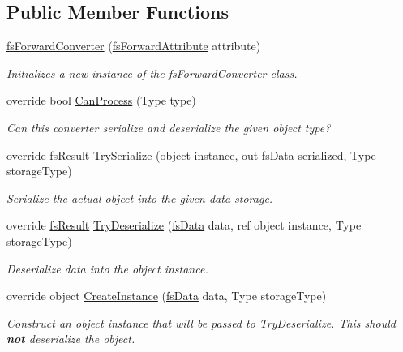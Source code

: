 \subsection*{Public Member Functions}
\begin{DoxyCompactItemize}
\item 
\hyperlink{class_full_serializer_1_1_internal_1_1fs_forward_converter_a485561a31edc65a3f1c6972af8b677e3}{fs\+Forward\+Converter} (\hyperlink{class_full_serializer_1_1fs_forward_attribute}{fs\+Forward\+Attribute} attribute)
\begin{DoxyCompactList}\small\item\em Initializes a new instance of the \hyperlink{class_full_serializer_1_1_internal_1_1fs_forward_converter}{fs\+Forward\+Converter} class. \end{DoxyCompactList}\item 
override bool \hyperlink{class_full_serializer_1_1_internal_1_1fs_forward_converter_a252f2f0a0391e2099be798b1749a2582}{Can\+Process} (Type type)
\begin{DoxyCompactList}\small\item\em Can this converter serialize and deserialize the given object type? \end{DoxyCompactList}\item 
override \hyperlink{struct_full_serializer_1_1fs_result}{fs\+Result} \hyperlink{class_full_serializer_1_1_internal_1_1fs_forward_converter_a71b51a115cf749f1a3232fb1498f2d6f}{Try\+Serialize} (object instance, out \hyperlink{class_full_serializer_1_1fs_data}{fs\+Data} serialized, Type storage\+Type)
\begin{DoxyCompactList}\small\item\em Serialize the actual object into the given data storage. \end{DoxyCompactList}\item 
override \hyperlink{struct_full_serializer_1_1fs_result}{fs\+Result} \hyperlink{class_full_serializer_1_1_internal_1_1fs_forward_converter_a81d2d460112d57d67e8156cd5a52e1e1}{Try\+Deserialize} (\hyperlink{class_full_serializer_1_1fs_data}{fs\+Data} data, ref object instance, Type storage\+Type)
\begin{DoxyCompactList}\small\item\em Deserialize data into the object instance. \end{DoxyCompactList}\item 
override object \hyperlink{class_full_serializer_1_1_internal_1_1fs_forward_converter_ac060a50ae6f3241ea0f9465e1d261d12}{Create\+Instance} (\hyperlink{class_full_serializer_1_1fs_data}{fs\+Data} data, Type storage\+Type)
\begin{DoxyCompactList}\small\item\em Construct an object instance that will be passed to Try\+Deserialize. This should {\bfseries not} deserialize the object. \end{DoxyCompactList}\end{DoxyCompactItemize}

